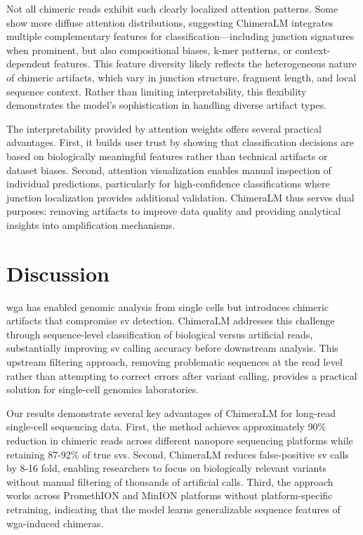 \documentclass[pdflatex,sn-nature,lineno]{sn-jnl}%
\theoremstyle{thmstyleone}%
\theoremstyle{thmstyletwo}%
\theoremstyle{thmstylethree}%
\begin{document}
Not all chimeric reads exhibit such clearly localized attention patterns. 
Some show more diffuse attention distributions, suggesting ChimeraLM integrates multiple complementary features for classification—including junction signatures when prominent, but also compositional biases, k-mer patterns, or context-dependent features. 
This feature diversity likely reflects the heterogeneous nature of chimeric artifacts, which vary in junction structure, fragment length, and local sequence context. 
Rather than limiting interpretability, this flexibility demonstrates the model's sophistication in handling diverse artifact types.

The interpretability provided by attention weights offers several practical advantages. 
First, it builds user trust by showing that classification decisions are based on biologically meaningful features rather than technical artifacts or dataset biases. 
Second, attention visualization enables manual inspection of individual predictions, particularly for high-confidence classifications where junction localization provides additional validation. 
ChimeraLM thus serves dual purposes: removing artifacts to improve data quality and providing analytical insights into amplification mechanisms.

\section*{Discussion}\label{sec:discussion}

\gls{wga} has enabled genomic analysis from single cells but introduces chimeric artifacts that compromise \gls{sv} detection.
ChimeraLM addresses this challenge through sequence-level classification of biological versus artificial reads, substantially improving \gls{sv} calling accuracy before downstream analysis.
This upstream filtering approach, removing problematic sequences at the read level rather than attempting to correct errors after variant calling, provides a practical solution for single-cell genomics laboratories.

Our results demonstrate several key advantages of ChimeraLM for long-read single-cell sequencing data.
First, the method achieves approximately 90\% reduction in chimeric reads across different nanopore sequencing platforms while retaining 87-92\% of true \glspl{sv}.
Second, ChimeraLM reduces false-positive \gls{sv} calls by 8-16 fold, enabling researchers to focus on biologically relevant variants without manual filtering of thousands of artificial calls.
Third, the approach works across PromethION and MinION platforms without platform-specific retraining, indicating that the model learns generalizable sequence features of \gls{wga}-induced chimeras.
\end{document}
